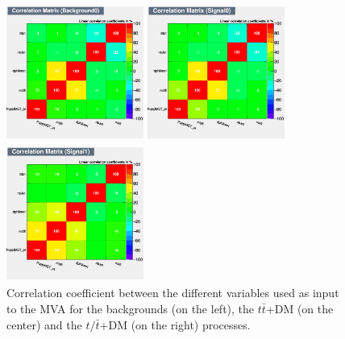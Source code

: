 \documentclass[a4paper, 10pt, openright]{report}
\begin{document}
\begin{figure}[htbp]
\centering
\begin{minipage}[b]{.32\textwidth}
\includegraphics[width=4.5cm, height=4.5cm]{figs/corr_bkg.png}
\end{minipage}\hfill
\begin{minipage}[b]{.32\textwidth}
\includegraphics[width=4.5cm, height=4.5cm]{figs/corr_signal0.png}
\end{minipage}\hfill
\begin{minipage}[b]{.32\textwidth}
\includegraphics[width=4.5cm, height=4.5cm]{figs/corr_signal1.png}
\end{minipage} \hfill
\caption{Correlation coefficient between the different variables used as input to the \ac{MVA} for the backgrounds (on the left), the $t \bar t$+DM (on the center) and the $t/\bar t$+DM (on the right) processes.}
\label{fig:correlationVar}
\end{figure}
\end{document}
